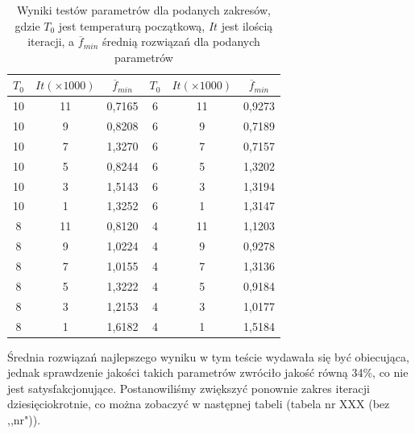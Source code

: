 \documentclass[twoside]{projektInzynierskiMS1}
\newcommand{\si}{ś}
\begin{document}
\begin{table}[htbp]\centering
\def\sym#1{\ifmmode^{#1}\else\(^{#1}\)\fi}
\caption{Wyniki testów parametrów dla podanych zakresów, gdzie $T_0$ jest temperaturą początkową, $It$ jest ilo\si cią iteracji, a $\overline{f}_{min}$ \si rednią rozwiązań dla podanych parametrów}
\begin{tabular}{|c|c|c||c|c|c|} 
                  \hline
                  $T_0$
                  & $It (\times 1000)$
                  & $\overline{f}_{min}$ 
& $T_0$
 & $It (\times 1000)$
 & $\overline{f}_{min}$ \\ \hline


10 & 11 & 0,7165&6 & 11 & 0,9273 \\ \hline 
10 & 9 & 0,8208 &6 & 9 & 0,7189 \\ \hline 
10 & 7 & 1,3270 &6 & 7 & 0,7157 \\ \hline 
10 & 5 & 0,8244 &6 & 5 & 1,3202 \\ \hline  
10 & 3 & 1,5143 &6 & 3 & 1,3194 \\ \hline 
10 & 1 & 1,3252 &6 & 1 & 1,3147 \\ \Xhline{3\arrayrulewidth}

8 & 11 & 0,8120 &4 & 11 & 1,1203 \\ \hline 
8 & 9 & 1,0224 &4 & 9 & 0,9278 \\ \hline 
8 & 7 & 1,0155 &4 & 7 & 1,3136 \\ \hline 
8 & 5 & 1,3222 &4 & 5 & 0,9184 \\ \hline
8 & 3 & 1,2153 &4 & 3 & 1,0177 \\ \hline 
8 & 1 & 1,6182 &4 & 1 & 1,5184 \\ \hline

\end{tabular} 
\end{table}

Średnia rozwiązań najlepszego wyniku w tym te\si cie wydawała się być obiecująca, jednak sprawdzenie jako\si ci takich parametrów zwróciło jako\si ć równą 34\%, co nie jest satysfakcjonujące. Postanowili\si my zwiększyć ponownie zakres iteracji dziesięciokrotnie, co można zobaczyć w następnej tabeli (tabela nr XXX (bez ,,nr")).
\end{document}
